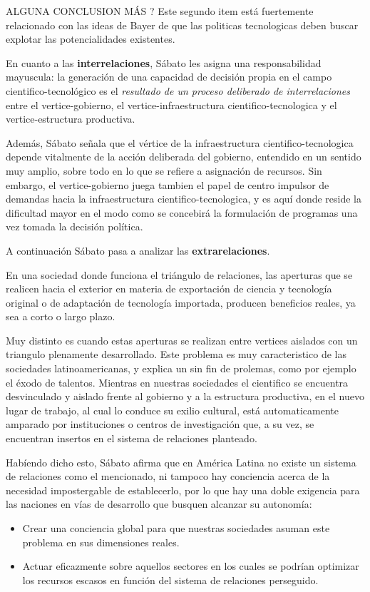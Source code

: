 ALGUNA CONCLUSION MÁS ?
Este segundo item está fuertemente relacionado con las ideas de Bayer de que las politicas tecnologicas deben buscar explotar las potencialidades existentes.

\vspace{0.5em}

En cuanto a las \textbf{interrelaciones}, Sábato les asigna una responsabilidad mayuscula: la generación de una capacidad de decisión propia en el campo cientifico-tecnológico es el \textit{resultado de un proceso deliberado de interrelaciones} entre el vertice-gobierno, el vertice-infraestructura cientifico-tecnologica y el vertice-estructura productiva.

Además, Sábato señala que el vértice de la infraestructura cientifico-tecnologica depende vitalmente de la acción deliberada del gobierno, entendido en un sentido muy amplio, sobre todo en lo que se refiere a asignación de recursos. Sin embargo, el vertice-gobierno juega tambien el papel de centro impulsor de demandas hacia la infraestructura cientifico-tecnologica, y es aquí donde reside la dificultad mayor en el modo como se concebirá la formulación de programas una vez tomada la decisión política.

\vspace{0.5em}

A continuación Sábato pasa a analizar las \textbf{extrarelaciones}.

En una sociedad donde funciona el triángulo de relaciones, las aperturas que se realicen hacia el exterior en materia de exportación de ciencia y tecnología original o de adaptación de tecnología importada, producen beneficios reales, ya sea a corto o largo plazo.

Muy distinto es cuando estas aperturas se realizan entre vertices aislados con un triangulo plenamente desarrollado. Este problema es muy caracteristico de las sociedades latinoamericanas, y explica un sin fin de prolemas, como por ejemplo el éxodo de talentos. Mientras en nuestras sociedades el cientifico se encuentra desvinculado y aislado frente al gobierno y a la estructura productiva, en el nuevo lugar de trabajo, al cual lo conduce su exilio cultural, está automaticamente amparado por instituciones o centros de investigación que, a su vez, se encuentran insertos en el sistema de relaciones planteado.

\vspace{0.5em}

Habíendo dicho esto, Sábato afirma que en América Latina no existe un sistema de relaciones como el mencionado, ni tampoco hay conciencia acerca de la necesidad impostergable de establecerlo, por lo que hay una doble exigencia para las naciones en vías de desarrollo que busquen alcanzar su autonomía:
\begin{itemize}
    \item Crear una conciencia global para que nuestras sociedades asuman este problema en sus dimensiones reales.
    \item Actuar eficazmente sobre aquellos sectores en los cuales se podrían optimizar los recursos escasos en función del sistema de relaciones perseguido.
\end{itemize}

